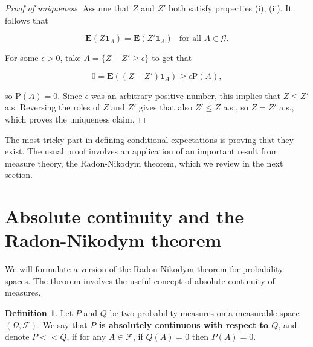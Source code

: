 \documentclass[11pt]{report}
\theoremstyle{plain}
\theoremstyle{definition}
\newtheorem{defn}[thm]{Definition}
\begin{document}
\begin{proof}[Proof of uniqueness]
Assume that $Z$ and $Z'$ both satisfy properties (i),
(ii). It follows that

\[
\mathbf{E}(Z \mathbf{1}_A) = \mathbf{E}(Z' \mathbf{1}_A)\ \  \textrm{ for all }A \in \mathcal{G}.
\]

\noindent For some $\epsilon>0$, take
$A = \{ Z-Z' \ge \epsilon \}$ to get that

\[
0 = \mathbf{E}( (Z-Z')\mathbf{1}_A ) \ge \epsilon \mathrm{P}(A),
\]

\noindent so $\mathrm{P}(A) = 0$. Since $\epsilon$ was an
arbitrary positive number, this implies that $Z\le Z'$
a.s. Reversing the roles of $Z$ and $Z'$ gives that
also $Z'\le Z$ a.s., so $Z=Z'$ a.s., which proves the
uniqueness claim.
\end{proof}

\noindent The most tricky part in defining conditional
expectations is proving that they exist. The usual
proof involves an application of an important result
from measure theory, the Radon-Nikodym theorem, which
we review in the next section.

\section{Absolute continuity and the Radon-Nikodym theorem}

We will formulate a version of the Radon-Nikodym
theorem for probability spaces. The theorem involves
the useful concept of absolute continuity of measures.

\begin{defn}
Let $P$ and $Q$ be two probability measures on a
measurable space $(\Omega, \mathcal{F})$. We say that
\textbf{$P$ is absolutely continuous with respect to $Q$},
and denote $P<<Q$, if for any $A\in\mathcal{F}$, if
$Q(A)=0$ then $P(A)=0$.
\end{defn}
\end{document}
